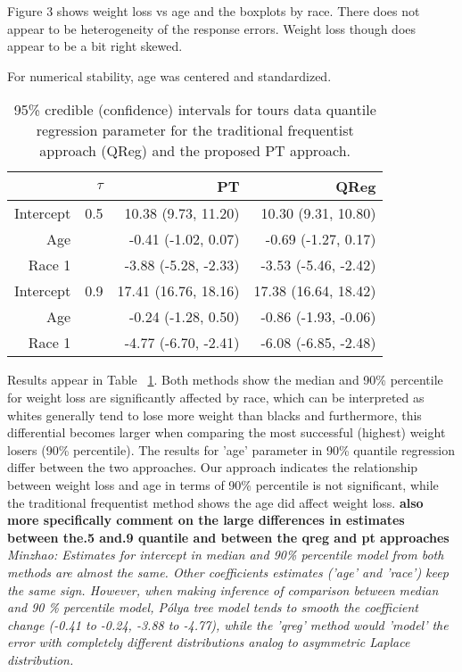 \documentclass[12pt]{article}
\newcommand{\polya}{P\'{o}lya}
\begin{document}
Figure 3 shows weight loss vs age and the boxplots by race.  There
does not appear to be heterogeneity of the response errors. Weight
loss though does appear to be a bit right skewed.

For numerical stability, age was centered and standardized.


\begin{table}[h]
  \caption[]{\label{tab:tours} 95\% credible (confidence) intervals for
    tours data quantile regression parameter for the
    traditional frequentist approach (QReg) and the proposed PT approach.}
  \vspace{4mm}

  \centering
  \begin{tabular}{rrrr}
    \toprule
              & $\tau$ & PT                   & QReg                 \\
    \hline
    Intercept & 0.5    & 10.38 (9.73, 11.20)  & 10.30 (9.31, 10.80)  \\
    Age       &        & -0.41 (-1.02, 0.07)  & -0.69 (-1.27, 0.17)  \\
    Race 1    &        & -3.88 (-5.28, -2.33) & -3.53 (-5.46, -2.42) \\
    \hline
    Intercept & 0.9    & 17.41 (16.76, 18.16) & 17.38 (16.64, 18.42) \\
    Age       &        & -0.24 (-1.28, 0.50)  & -0.86 (-1.93, -0.06) \\
    Race 1    &        & -4.77 (-6.70, -2.41) & -6.08 (-6.85, -2.48) \\
    \bottomrule
  \end{tabular}
\end{table}

Results appear in Table ~\ref{tab:tours}.  Both methods show the
median and 90\% percentile for weight loss are significantly affected
by race, which can be interpreted as whites generally tend to lose
more weight than blacks and furthermore, this differential becomes
larger when comparing the most successful (highest) weight losers
(90\% percentile). The results for 'age' parameter in 90\% quantile
regression differ between the two approaches.  Our approach indicates
the relationship between weight loss and age in terms of 90\%
percentile is not significant, while the traditional frequentist
method shows the age did affect weight loss.  {\bf also more
  specifically comment on the large differences in estimates between
  the.5 and.9 quantile and between the qreg and pt approaches} {\it
  Minzhao: Estimates for intercept in median and 90\% percentile model
  from both methods are almost the same. Other coefficients estimates
  ('age' and 'race') keep the same sign. However, when making
  inference of comparison between median and 90 \% percentile model,
  \polya{} tree model tends to smooth the coefficient change (-0.41 to
  -0.24, -3.88 to -4.77), while the 'qreg' method would 'model' the
  error with completely different distributions analog to asymmetric
  Laplace distribution.}
\end{document}
